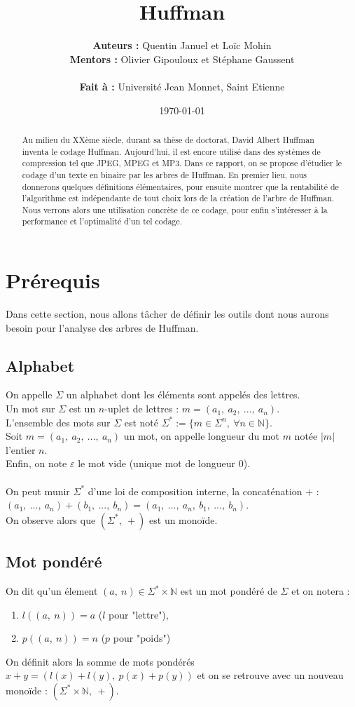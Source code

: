 \documentclass[a4paper, 12pt]{article}
\title{Huffman}
\author{
\textbf{Auteurs :} Quentin Januel et Loïc Mohin \\
\textbf{Mentors :} Olivier Gipouloux et Stéphane Gaussent \\ \\
\textbf{Fait à :} Université Jean Monnet, Saint Etienne
}
\date{\today}
\begin{document}
\maketitle
\begin{abstract}
Au milieu du XXème siècle, durant sa thèse de doctorat, David Albert Huffman inventa le codage Huffman. Aujourd'hui, il est encore utilisé dans des systèmes de compression tel que JPEG, MPEG et MP3.
Dans ce rapport, on se propose d'étudier le codage d'un texte en binaire par les arbres de Huffman. En premier lieu, nous donnerons quelques définitions élémentaires, pour ensuite montrer que la rentabilité de l'algorithme est indépendante de tout choix lors de la création de l'arbre de Huffman. Nous verrons alors une utilisation concrète de ce codage, pour enfin s'intéresser à la performance et l'optimalité d'un tel codage.
\end{abstract}
\newpage
\tableofcontents{}
\newpage

\section{Prérequis}

Dans cette section, nous allons tâcher de définir les outils dont nous aurons besoin pour l'analyse des arbres de Huffman.

\subsection{Alphabet}
On appelle $\Sigma$ un alphabet dont les éléments sont appelés des lettres. \\
Un mot sur $\Sigma$ est un $n$-uplet de lettres : $m = (a_1,\ a_2,\ ...,\ a_n)$. \\
L'ensemble des mots sur $\Sigma$ est noté $\Sigma^* := \{m \in \Sigma^n,\ \forall n \in \mathbb{N}\}$. \\
Soit $m = (a_1,\ a_2,\ ...,\ a_n)$ un mot, on appelle longueur du mot $m$ notée $|m|$ l'entier $n$. \\
Enfin, on note $\varepsilon$ le mot vide (unique mot de longueur $0$). \\ \\
On peut munir $\Sigma^*$ d'une loi de composition interne, la concaténation $+$ : \\
$(a_1,\ ...,\ a_n)+(b_1,\ ...,\ b_n) = (a_1,\ ...,\ a_n,\ b_1,\ ...,\ b_n)$. \\
On observe alors que $(\Sigma^*,\ +)$ est un monoïde.

\subsection{Mot pondéré}
On dit qu'un élement $(a,\ n)\in \Sigma^*\times \mathbb{N}$ est un mot pondéré de $\Sigma$ et on notera :
\begin{enumerate}
\item $l((a,\ n)) = a$ ($l$ pour "lettre"),
\item $p((a,\ n)) = n$ ($p$ pour "poids")
\end{enumerate}
On définit alors la somme de mots pondérés $x+y = (l(x)+l(y),\ p(x)+p(y))$ et on se retrouve avec un nouveau monoïde :  $(\Sigma^*\times \mathbb{N},\ +)$.
\end{document}

